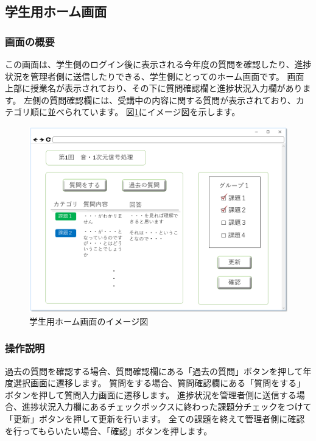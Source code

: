 \subsection{学生用ホーム画面}
\subsubsection{画面の概要}
この画面は、学生側のログイン後に表示される今年度の質問を確認したり、進捗状況を管理者側に送信したりできる、学生側にとってのホーム画面です。
画面上部に授業名が表示されており、その下に質問確認欄と進捗状況入力欄があります。
左側の質問確認欄には、受講中の内容に関する質問が表示されており、カテゴリ順に並べられています。
図\ref{fig:sc_class_student}にイメージ図を示します。

\begin{figure}[htbp]
\begin{center}
  \includegraphics[width=1\linewidth,clip]{./img/sc_class_student.png}
  \caption{学生用ホーム画面のイメージ図}\label{fig:sc_class_student}
\end{center}
\end{figure}

\subsubsection{操作説明}
過去の質問を確認する場合、質問確認欄にある「過去の質問」ボタンを押して年度選択画面に遷移します。
質問をする場合、質問確認欄にある「質問をする」ボタンを押して質問入力画面に遷移します。
進捗状況を管理者側に送信する場合、進捗状況入力欄にあるチェックボックスに終わった課題分チェックをつけて「更新」ボタンを押して更新を行います。
全ての課題を終えて管理者側に確認を行ってもらいたい場合、「確認」ボタンを押します。

